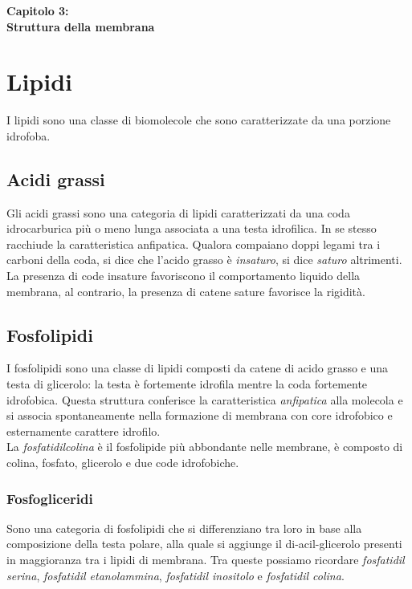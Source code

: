 \Huge\textbf{Capitolo 3: \\ Struttura della membrana}

\section{Lipidi}
    \small
    I lipidi sono una classe di biomolecole che sono caratterizzate da una porzione idrofoba. 
    
    \subsection{Acidi grassi}
        Gli acidi grassi sono una categoria di lipidi caratterizzati da una coda idrocarburica più o meno lunga associata a una testa idrofilica. In se stesso racchiude la caratteristica anfipatica.
        Qualora compaiano doppi legami tra i carboni della coda, si dice che l'acido grasso è \textit{insaturo}, si dice \textit{saturo} altrimenti. La presenza di code insature favoriscono il comportamento liquido della membrana, al contrario, la presenza di catene sature favorisce la rigidità.
        
    \subsection{Fosfolipidi}
        I fosfolipidi sono una classe di lipidi composti da catene di acido grasso e una testa di glicerolo: la testa è fortemente idrofila mentre la coda fortemente idrofobica.
        Questa struttura conferisce la caratteristica \textit{anfipatica} alla molecola e si associa spontaneamente nella formazione di membrana con core idrofobico e esternamente carattere idrofilo.\\
        La \textit{fosfatidilcolina} è il fosfolipide più abbondante nelle membrane, è composto di colina, fosfato, glicerolo e due code idrofobiche.
        \subsubsection{Fosfogliceridi}
            Sono una categoria di fosfolipidi che si differenziano tra loro in base alla composizione della testa polare, alla quale si aggiunge il di-acil-glicerolo presenti in maggioranza tra i lipidi di membrana. Tra queste possiamo ricordare \textit{fosfatidil serina}, \textit{fosfatidil etanolammina}, \textit{fosfatidil inositolo} e \textit{fosfatidil colina}.\\
            
